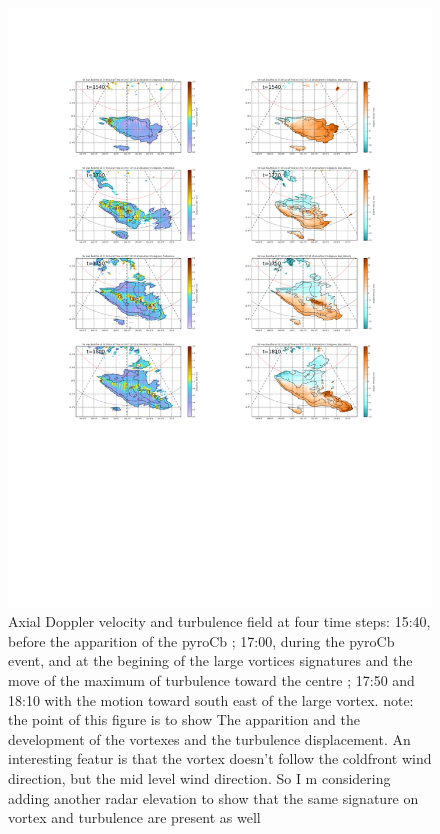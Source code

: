 \documentclass[12pt]{article}
\begin{document}
\begin{figure}[position]
   \caption{\label{tur_vel} Axial Doppler velocity and turbulence field at four time steps: 15:40, before the apparition of the pyroCb ; 17:00, during the pyroCb event, and at the begining of the large vortices signatures and the move of the maximum of turbulence toward the centre ; 17:50 and 18:10 with the motion toward south east of the large vortex. {\color{red} note: the point of this figure is to show The apparition and the development of the vortexes and the turbulence displacement. An interesting featur is that the vortex doesn't follow the coldfront wind direction, but the mid level wind direction. So I m considering adding another radar elevation to show that the same signature on vortex and turbulence are present as well} }
   \includegraphics[width=\textwidth]{figures/vel_turb.png}
\end{figure}
\end{document}
